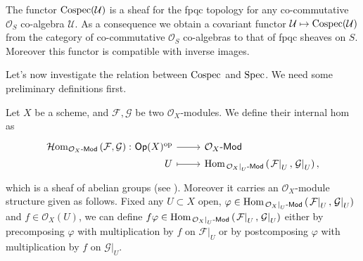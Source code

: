 \begin{rem}
	The functor $\operatorname{Cospec}(\mathcal{U})$ is a sheaf for the fpqc topology
	for any co-commutative $\mathcal{O}_{ S }$ co-algebra $\mathcal{U}$.
	As a consequence we obtain a covariant functor $\mathcal{U} \mapsto \operatorname{Cospec}(\mathcal{U})$
	from the category of co-commutative $\mathcal{O}_{ S }$ co-algebras 
	to that of fpqc sheaves on $S$.
	Moreover this functor is compatible with inverse images.
\end{rem}


\noindent
Let's now investigate the relation between $\operatorname{Cospec}$ and $\operatorname{Spec}$.
We need some preliminary definitions first.
\begin{defn}\label{defn:iHomOXMod}
	Let $X$ be a scheme, and $\mathcal{F}, \mathcal{G}$ be two $\mathcal{O}_{ X }$-modules.
	We define their internal hom as
	\begin{equation*}
	\begin{tikzcd}[row sep = 0ex
		,/tikz/column 1/.append style={anchor=base east}
		,/tikz/column 2/.append style={anchor=base west}]
		\mathcal{H}\mathrm{om}_{ \mathcal{O}_{ X }\text{-}\mathsf{Mod} }
		\left( \mathcal{F}, \mathcal{G} \right)\colon 
		\mathsf{Op}(X)^{\mathrm{op}} \arrow[r, "", rightarrow] &
		\mathcal{O}_{ X }\text{-}\mathsf{Mod} \\
		U \arrow[r, "", mapsto] & 
		\Hom_{ \left.\mathcal{O}_{ X }\right|_{U}\text{-}\mathsf{Mod} } 
			\left( \left.\mathcal{F}\right|_{U}, \left.\mathcal{G}\right|_{U} \right)
	,\end{tikzcd}
	\end{equation*} 
	which is a sheaf of abelian groups (see 
	\cite[\href{https://stacks.math.columbia.edu/tag/00AK}{Section 00AK}]{SP}).
	Moreover it carries an $\mathcal{O}_{ X }$-module structure given as follows.
	Fixed any $U \subset X$ open, 
	$\varphi \in \operatorname{Hom}_{ \left.\mathcal{O}_{ X }\right|_{U}\text{-}\mathsf{Mod}} 
	\left( \left.\mathcal{F}\right|_{U} , \left.\mathcal{G}\right|_{U} \right)$ and
	$f \in \mathcal{O}_{ X }(U)$, we can define $f \varphi \in
	\operatorname{Hom}_{ \left.\mathcal{O}_{ X }\right|_{U}\text{-}\mathsf{Mod}  } 
	\left( \left.\mathcal{F}\right|_{U} , \left.\mathcal{G}\right|_{U} \right)$
	either by precomposing $\varphi$ with multiplication
	by $f$ on $\left.\mathcal{F}\right|_{U}$ or by postcomposing $\varphi$
	with multiplication by $f$ on $\left.\mathcal{G}\right|_{U}$.
\end{defn}



